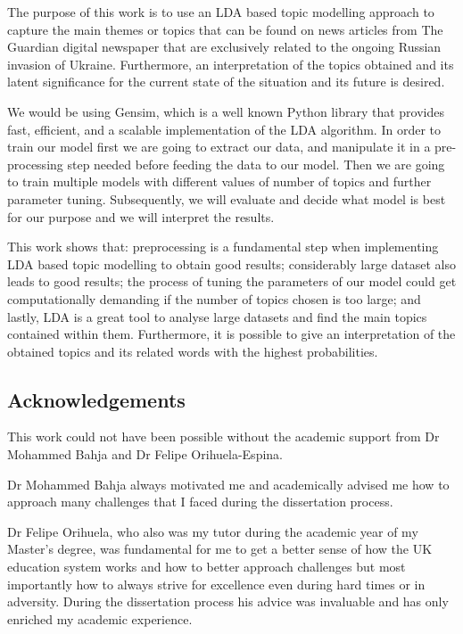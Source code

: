 \documentclass[twoside,12pt,a4paper]{article}
\begin{document}
The purpose of this work is to use an LDA based topic modelling approach to capture the main themes or topics that can be found on news articles from The Guardian digital newspaper that are exclusively related to the ongoing Russian invasion of Ukraine. Furthermore, an interpretation of the topics obtained and its latent significance for the current state of the situation and its future is desired.

We would be using Gensim, which is a well known Python library that provides fast, efficient, and a scalable implementation of the LDA algorithm. In order to train our model first we are going to extract our data, and manipulate it in a pre-processing step needed before feeding the data to our model. Then we are going to train multiple models with different values of number of topics and further parameter tuning. Subsequently, we will evaluate and decide what model is best for our purpose and we will interpret the results.

This work shows that: preprocessing is a fundamental step when implementing LDA based topic modelling to obtain good results; considerably large dataset also leads to good results; the process of tuning the parameters of our model could get computationally demanding if the number of topics chosen is too large; and lastly, LDA is a great tool to analyse large datasets and find the main topics contained within them. Furthermore, it is possible to give an interpretation of the obtained topics and its related words with the highest probabilities. 

\subsection{Acknowledgements}
This work could not have been possible without the academic support from Dr Mohammed Bahja and Dr Felipe Orihuela-Espina.

Dr Mohammed Bahja always motivated me and academically advised me how to approach many challenges that I faced during the dissertation process.

Dr Felipe Orihuela, who also was my tutor during the academic year of my Master's degree, was fundamental for me to get a better sense of how the UK education system works and how to better approach challenges but most importantly how to always strive for excellence even during hard times or in adversity. During the dissertation process his advice was invaluable and has only enriched my academic experience.

\clearpage
\end{document}
